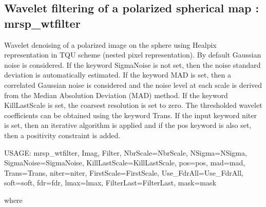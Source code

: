 \subsection{Wavelet filtering of a polarized spherical map : mrsp\_wtfilter}
Wavelet denoising of a polarized image on the sphere using Healpix representation in TQU scheme (nested pixel representation). 
By default Gaussian noise is considered. If the keyword SigmaNoise is not set, then the noise standard deviation is automatically 
estimated. If the keyword MAD is set, then a correlated Gaussian noise is considered and the noise level at each scale is derived 
from the Median Absolution Deviation (MAD) method. If the keyword KillLastScale is set, the coarsest resolution is set to zero. 
The thresholded wavelet coefficients can be obtained using the keyword Trans. If the input keyword niter is set, then an iterative 
algorithm is applied and if the pos keyword is also set, then a positivity constraint is added.
{\bf
\begin{center}
     USAGE:  mrsp\_wtfilter, Imag, Filter, NbrScale=NbrScale, NSigma=NSigma, SigmaNoise=SigmaNoise, KillLastScale=KillLastScale, 
     pos=pos, mad=mad, Trans=Trans, niter=niter, FirstScale=FirstScale, Use\_FdrAll=Use\_FdrAll, soft=soft, fdr=fdr, lmax=lmax, 
     FilterLast=FilterLast, mask=mask 
\end{center}}
where
